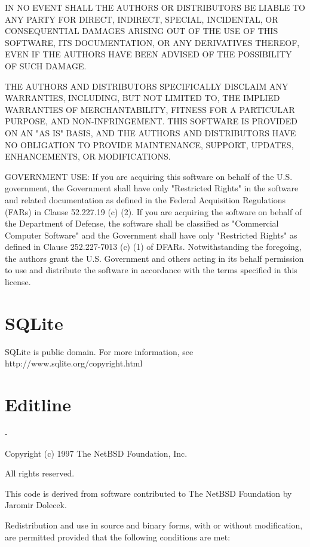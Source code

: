 \documentclass[a4paper,twoside]{tceusermanual}
\begin{document}
IN NO EVENT SHALL THE AUTHORS OR DISTRIBUTORS BE LIABLE TO ANY PARTY FOR DIRECT, INDIRECT, SPECIAL, INCIDENTAL, OR CONSEQUENTIAL DAMAGES ARISING OUT OF THE USE OF THIS SOFTWARE, ITS DOCUMENTATION, OR ANY DERIVATIVES THEREOF, EVEN IF THE AUTHORS HAVE BEEN ADVISED OF THE POSSIBILITY OF SUCH DAMAGE.

THE AUTHORS AND DISTRIBUTORS SPECIFICALLY DISCLAIM ANY WARRANTIES, INCLUDING, BUT NOT LIMITED TO, THE IMPLIED WARRANTIES OF MERCHANTABILITY, FITNESS FOR A PARTICULAR PURPOSE, AND NON-INFRINGEMENT. THIS SOFTWARE IS PROVIDED ON AN "AS IS" BASIS, AND THE AUTHORS AND DISTRIBUTORS HAVE NO OBLIGATION TO PROVIDE MAINTENANCE, SUPPORT, UPDATES, ENHANCEMENTS, OR MODIFICATIONS.

GOVERNMENT USE: If you are acquiring this software on behalf of the U.S. government, the Government shall have only "Restricted Rights" in the software and related documentation as defined in the Federal Acquisition Regulations (FARs) in Clause 52.227.19 (c) (2). If you are acquiring the software on behalf of the Department of Defense, the software shall be classified as "Commercial Computer Software" and the Government shall have only "Restricted Rights" as defined in Clause 252.227-7013 (c) (1) of DFARs. Notwithstanding the foregoing, the authors grant the U.S. Government and others acting in its behalf permission to use and distribute the software in accordance with the terms specified in this license.

\section{SQLite}

SQLite is public domain. For more information, see http://www.sqlite.org/copyright.html

\section{Editline}

   -

   Copyright (c) 1997 The NetBSD Foundation, Inc.

   All rights reserved.
  
   This code is derived from software contributed to The NetBSD Foundation
   by Jaromir Dolecek.
  
   Redistribution and use in source and binary forms, with or without
   modification, are permitted provided that the following conditions
   are met:
\end{document}
